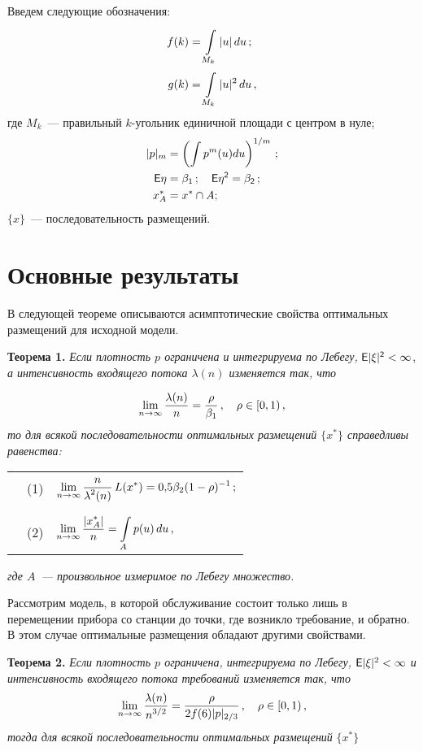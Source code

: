 \begin{multicols}{2}
Введем следующие обозначения:
\begin{align*}
f(k)&=\int\limits_{M_k}^{}\vert u\vert\,du\,;\\
g(k)&=\int\limits_{M_k}^{}\vert u\vert^2\,du\,,
\end{align*}
где $M_k$~--- правильный $k$-угольник единичной площади с центром в нуле;
\begin{align*}
\vert p\vert_m & =\left( \int p^m(u)du\right )^{1/m}\,;\\
\sf E\eta &= \beta_1\,; \quad \sf E\eta^2=\beta_2\,;\\
x_A^*& =x^*\cap A;
\end{align*}
$\{x\}$~--- последовательность размещений.

\section{Основные результаты}

В следующей теореме описываются асимптотические свойства оптимальных размещений для исходной
модели.

\smallskip
{\bf{Теоpема 1.} } {\it Если плотность $p$ ограничена и
интегрируема по Лебегу,} $\sf E\vert \xi\vert^2<\infty$, {\it а
интенсивность входящего потока $\lambda(n)$ изменяется так, что}

\noindent
$$
\lim\limits_{n\to\infty}\displaystyle\frac{\displaystyle \lambda(n)\mathstrut}{\displaystyle n\mathstrut}=\displaystyle\frac{\displaystyle \rho\mathstrut}{\displaystyle \beta_1\mathstrut}\,,\quad \rho\in [0,1)\,,
$$
{\it то для всякой последовательности оптимальных размещений
$\{x^*\}$ справедливы равенства:}
\begin{center}
\begin{tabular}{lcl}
&(1)&$\lim\limits_{n\rightarrow \infty}\displaystyle\frac{\displaystyle n\mathstrut}{\displaystyle \lambda^2(n)\mathstrut}\,L(x^*)=0{,}5\beta_2(1-\rho)^{-1}\,;$\\
\\
&(2)&$\lim\limits_{n\rightarrow\infty}\displaystyle\frac{\displaystyle \vert x_A^* \vert \mathstrut}{\displaystyle n\mathstrut}=\int\limits_{A}^{}p(u)\,du\,,$
\end{tabular}
\end{center}
{\it где $A$~--- произвольное измеримое по Лебегу множество.}

Рассмотрим модель, в которой обслуживание состоит только
лишь в перемещении прибора со станции до точки, где возникло
требование, и обратно. В этом случае оптимальные размещения
обладают другими свойствами.

\smallskip
{\bf{Теоpема 2.} } {\it Если плотность $p$ ограничена,
интегрируема по Лебегу,} ${\sf E}\vert \xi\vert^2<\infty$ {\it и интенсивность
входящего потока требований изменяется так, что}
$$
\lim\limits_{n\to\infty}\displaystyle\frac{\displaystyle \lambda(n)\mathstrut}{\displaystyle n^{3/2}\mathstrut}=\displaystyle\frac{\displaystyle \rho\mathstrut}{\displaystyle 2f(6)\vert p\vert_{2/3}\mathstrut}\,, \quad
\rho\in [0,1)\,,
$$
{\it тогда для всякой последовательности оптимальных размещений} $\{x^*\}$


\end{multicols}
